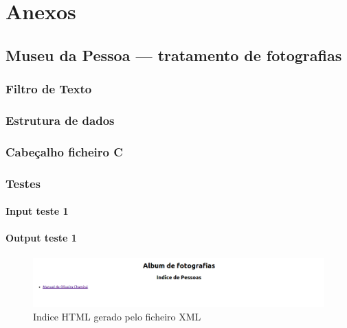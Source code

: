 \chapter{Anexos}
\label{cap:anex}


\section{Museu da Pessoa — tratamento de fotografias}
\label{seq:anex-museu}


\subsection{Filtro de Texto}
\label{seq:anex-museu-filtro}


\subsection{Estrutura de dados}
\label{seq:anex-museu-est}


\subsection{Cabeçalho ficheiro C}
\label{seq:anex-museu-header}


\subsection{Testes}
\label{seq:anex-museu-test}
\subsubsection{Input teste 1}
\label{seq:anex-museu-test-in01}


\subsubsection{Output teste 1}
\label{seq:anex-museu-test-out01-01}


\begin{figure}[H]
\centering
\includegraphics[width=15cm]{anexos/2-1/Exemplo1/Screenshots/indice.png}
\caption{Indice HTML gerado pelo ficheiro XML}
\end{figure}

